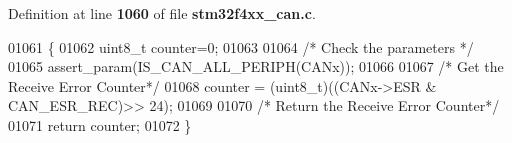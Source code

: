 Definition at line \textbf{ 1060} of file \textbf{ stm32f4xx\+\_\+can.\+c}.


\begin{DoxyCode}
01061 \{
01062   uint8\_t counter=0;
01063   
01064   \textcolor{comment}{/* Check the parameters */}
01065   assert_param(IS_CAN_ALL_PERIPH(CANx));
01066   
01067   \textcolor{comment}{/* Get the Receive Error Counter*/}
01068   counter = (uint8\_t)((CANx->ESR & CAN_ESR_REC)>> 24);
01069   
01070   \textcolor{comment}{/* Return the Receive Error Counter*/}
01071   \textcolor{keywordflow}{return} counter;
01072 \}
\end{DoxyCode}
